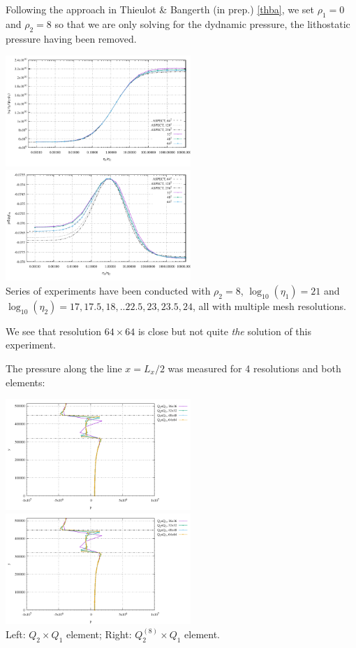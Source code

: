 Following the approach in Thieulot \& Bangerth (in prep.) \ref{thba}, 
we set $\rho_1=0$ and $\rho_2=8$ so that we are only solving for the dydnamic 
pressure, the lithostatic pressure having been removed.

\begin{center}
\includegraphics[width=7cm]{python_codes/fieldstone_53/results/reduced/results_v.pdf}
\includegraphics[width=7cm]{python_codes/fieldstone_53/results/reduced/results_p.pdf}\\
{\captionfont
Series of experiments have been conducted with $\rho_2=8$, 
$\log_{10}(\eta_1)=21$ and $\log_{10}(\eta_2)=17,17.5,18,..22.5,23,23.5,24$, 
all with multiple mesh resolutions.}
 \end{center}

We see that resolution $64\times 64$ is close but not quite {\sl the} solution of this experiment.

The pressure along the line $x=L_x/2$ was measured for 4 resolutions and both elements:
 
\begin{center}
\includegraphics[width=7cm]{python_codes/fieldstone_53/results/reduced/plines_q2q1.pdf}
\includegraphics[width=7cm]{python_codes/fieldstone_53/results/reduced/plines_ser.pdf}\\
{\captionfont Left: $Q_2\times Q_1$ element; Right: $Q_2^{(8)}\times Q_1$ element.}  
\end{center}

